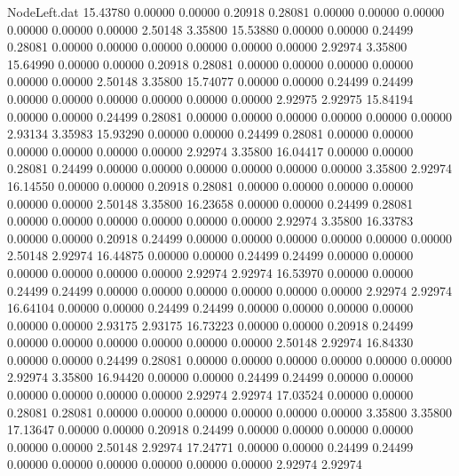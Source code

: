\begin{filecontents}{NodeLeft.dat}
  15.43780    0.00000    0.00000     0.20918    0.28081    0.00000    0.00000    0.00000    0.00000    0.00000    0.00000    2.50148    3.35800
  15.53880    0.00000    0.00000     0.24499    0.28081    0.00000    0.00000    0.00000    0.00000    0.00000    0.00000    2.92974    3.35800
  15.64990    0.00000    0.00000     0.20918    0.28081    0.00000    0.00000    0.00000    0.00000    0.00000    0.00000    2.50148    3.35800
  15.74077    0.00000    0.00000     0.24499    0.24499    0.00000    0.00000    0.00000    0.00000    0.00000    0.00000    2.92975    2.92975
  15.84194    0.00000    0.00000     0.24499    0.28081    0.00000    0.00000    0.00000    0.00000    0.00000    0.00000    2.93134    3.35983
  15.93290    0.00000    0.00000     0.24499    0.28081    0.00000    0.00000    0.00000    0.00000    0.00000    0.00000    2.92974    3.35800
  16.04417    0.00000    0.00000     0.28081    0.24499    0.00000    0.00000    0.00000    0.00000    0.00000    0.00000    3.35800    2.92974
  16.14550    0.00000    0.00000     0.20918    0.28081    0.00000    0.00000    0.00000    0.00000    0.00000    0.00000    2.50148    3.35800
  16.23658    0.00000    0.00000     0.24499    0.28081    0.00000    0.00000    0.00000    0.00000    0.00000    0.00000    2.92974    3.35800
  16.33783    0.00000    0.00000     0.20918    0.24499    0.00000    0.00000    0.00000    0.00000    0.00000    0.00000    2.50148    2.92974
  16.44875    0.00000    0.00000     0.24499    0.24499    0.00000    0.00000    0.00000    0.00000    0.00000    0.00000    2.92974    2.92974
  16.53970    0.00000    0.00000     0.24499    0.24499    0.00000    0.00000    0.00000    0.00000    0.00000    0.00000    2.92974    2.92974
  16.64104    0.00000    0.00000     0.24499    0.24499    0.00000    0.00000    0.00000    0.00000    0.00000    0.00000    2.93175    2.93175
  16.73223    0.00000    0.00000     0.20918    0.24499    0.00000    0.00000    0.00000    0.00000    0.00000    0.00000    2.50148    2.92974
  16.84330    0.00000    0.00000     0.24499    0.28081    0.00000    0.00000    0.00000    0.00000    0.00000    0.00000    2.92974    3.35800
  16.94420    0.00000    0.00000     0.24499    0.24499    0.00000    0.00000    0.00000    0.00000    0.00000    0.00000    2.92974    2.92974
  17.03524    0.00000    0.00000     0.28081    0.28081    0.00000    0.00000    0.00000    0.00000    0.00000    0.00000    3.35800    3.35800
  17.13647    0.00000    0.00000     0.20918    0.24499    0.00000    0.00000    0.00000    0.00000    0.00000    0.00000    2.50148    2.92974
  17.24771    0.00000    0.00000     0.24499    0.24499    0.00000    0.00000    0.00000    0.00000    0.00000    0.00000    2.92974    2.92974

\end{filecontents}
